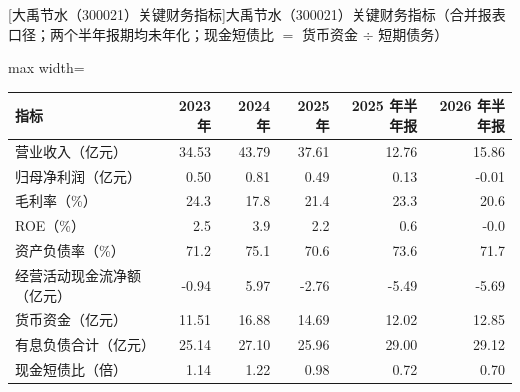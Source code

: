 \begin{center}\small\setlength{\tabcolsep}{3.4pt}
[大禹节水（300021）关键财务指标]{大禹节水（300021）关键财务指标（合并报表口径；两个半年报期均未年化；现金短债比 $=$ 货币资金 $\div$ 短期债务）}
\begin{adjustbox}{max width=\textwidth}
\begin{tabular}{@{}lrrrrr@{}}
\toprule
指标 & 2023 年 & 2024 年 & 2025 年 & 2025 年半年报 & 2026 年半年报 \\
\midrule
营业收入（亿元） & 34.53 & 43.79 & 37.61 & 12.76 & 15.86 \\
归母净利润（亿元） & 0.50 & 0.81 & 0.49 & 0.13 & -0.01 \\
毛利率（\%） & 24.3 & 17.8 & 21.4 & 23.3 & 20.6 \\
ROE（\%） & 2.5 & 3.9 & 2.2 & 0.6 & -0.0 \\
资产负债率（\%） & 71.2 & 75.1 & 70.6 & 73.6 & 71.7 \\
经营活动现金流净额（亿元） & -0.94 & 5.97 & -2.76 & -5.49 & -5.69 \\
货币资金（亿元） & 11.51 & 16.88 & 14.69 & 12.02 & 12.85 \\
有息负债合计（亿元） & 25.14 & 27.10 & 25.96 & 29.00 & 29.12 \\
现金短债比（倍） & 1.14 & 1.22 & 0.98 & 0.72 & 0.70 \\
\bottomrule
\end{tabular}
\end{adjustbox}
\end{center}

